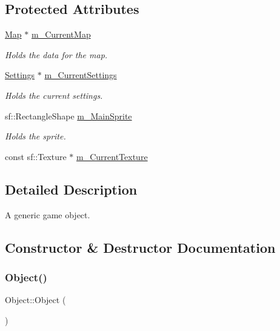 \subsection*{Protected Attributes}
\begin{DoxyCompactItemize}
\item 
\hyperlink{class_map}{Map} $\ast$ \hyperlink{class_object_a0ea9a20ed14789cabfa6a4b2d56b6c4f}{m\+\_\+\+Current\+Map}
\begin{DoxyCompactList}\small\item\em Holds the data for the map. \end{DoxyCompactList}\item 
\hyperlink{class_settings}{Settings} $\ast$ \hyperlink{class_object_ae56470c16db195a9b059fa8482333770}{m\+\_\+\+Current\+Settings}
\begin{DoxyCompactList}\small\item\em Holds the current settings. \end{DoxyCompactList}\item 
sf\+::\+Rectangle\+Shape \hyperlink{class_object_aa985332e74ddde62b618253570812de6}{m\+\_\+\+Main\+Sprite}
\begin{DoxyCompactList}\small\item\em Holds the sprite. \end{DoxyCompactList}\item 
const sf\+::\+Texture $\ast$ \hyperlink{class_object_a27be0a7890a5229f7e4770032e92f4ba}{m\+\_\+\+Current\+Texture}
\end{DoxyCompactItemize}


\subsection{Detailed Description}
A generic game object. 

\subsection{Constructor \& Destructor Documentation}
\mbox{\label{class_object_a40860402e64d8008fb42329df7097cdb}} 
\subsubsection{\texorpdfstring{Object()}{Object()}}
{\footnotesize\ttfamily Object\+::\+Object (\begin{DoxyParamCaption}{ }\end{DoxyParamCaption})}



